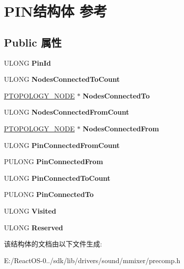 \hypertarget{struct_p_i_n}{}\section{P\+I\+N结构体 参考}
\label{struct_p_i_n}
\subsection*{Public 属性}
\begin{DoxyCompactItemize}
\item 
\mbox{\label{struct_p_i_n_a3bbf3baaee08bab55df1215390c69360}} 
U\+L\+O\+NG {\bfseries Pin\+Id}
\item 
\mbox{\label{struct_p_i_n_a0cef4c99fc46801100f7a774dedfebba}} 
U\+L\+O\+NG {\bfseries Nodes\+Connected\+To\+Count}
\item 
\mbox{\label{struct_p_i_n_ae40d08d0d0a75ef8462519f385bfbcf7}} 
\hyperlink{struct_____t_o_p_o_l_o_g_y___n_o_d_e____}{P\+T\+O\+P\+O\+L\+O\+G\+Y\+\_\+\+N\+O\+DE} $\ast$ {\bfseries Nodes\+Connected\+To}
\item 
\mbox{\label{struct_p_i_n_a3d6fccc468cf842463386cec955e2cf7}} 
U\+L\+O\+NG {\bfseries Nodes\+Connected\+From\+Count}
\item 
\mbox{\label{struct_p_i_n_a0ff9c72efb789d1e75c0651489d3c425}} 
\hyperlink{struct_____t_o_p_o_l_o_g_y___n_o_d_e____}{P\+T\+O\+P\+O\+L\+O\+G\+Y\+\_\+\+N\+O\+DE} $\ast$ {\bfseries Nodes\+Connected\+From}
\item 
\mbox{\label{struct_p_i_n_a3af6e5a497608b3b7662864ed921be40}} 
U\+L\+O\+NG {\bfseries Pin\+Connected\+From\+Count}
\item 
\mbox{\label{struct_p_i_n_a26db73ba7eb10a19b9f3972d5613b55b}} 
P\+U\+L\+O\+NG {\bfseries Pin\+Connected\+From}
\item 
\mbox{\label{struct_p_i_n_a0a242a80e3f933daea0e43bb2bb7575d}} 
U\+L\+O\+NG {\bfseries Pin\+Connected\+To\+Count}
\item 
\mbox{\label{struct_p_i_n_ae0f9643a5cd9a02adcf8fd24db52171b}} 
P\+U\+L\+O\+NG {\bfseries Pin\+Connected\+To}
\item 
\mbox{\label{struct_p_i_n_af84b51f664fa48996076acb88bdde858}} 
U\+L\+O\+NG {\bfseries Visited}
\item 
\mbox{\label{struct_p_i_n_a855691e60d10e843e62e58cce19d49bb}} 
U\+L\+O\+NG {\bfseries Reserved}
\end{DoxyCompactItemize}


该结构体的文档由以下文件生成\+:\begin{DoxyCompactItemize}
\item 
E\+:/\+React\+O\+S-\/0../sdk/lib/drivers/sound/mmixer/precomp.\+h\end{DoxyCompactItemize}
